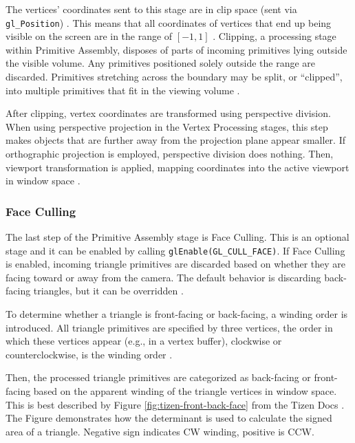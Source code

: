 \documentclass[
  digital,     %
  oneside,     %
  nosansbold,  %
  nocolorbold, %
  lof,         %
  lot,         %
]{fithesis4}
\begin{document}
The vertices' coordinates sent to this stage are in clip space (sent via \verb|gl_Position|) \cite{openglwiki-vertex-post-processing}.
This means that all coordinates of vertices that end up being visible on the screen are in the range of $[-1,1]$
\cite{learnopengl-coord-systems}. Clipping, a processing stage within Primitive Assembly, disposes of
parts of incoming primitives lying outside the visible volume. Any primitives positioned solely outside the range
are discarded. Primitives stretching across the boundary may be split, or \enquote{clipped}, into multiple primitives
that fit in the viewing volume \cite[p.12]{opengl-book}.

After clipping, vertex coordinates are transformed using perspective division.
When using perspective projection in the Vertex Processing stages, this step makes objects that are
further away from the projection plane appear smaller. If orthographic projection is employed,
perspective division does nothing.
Then, viewport transformation is applied, mapping coordinates
into the active viewport in window space \cite[p.12]{opengl-book}.

\subsubsection{Face Culling}
The last step of the Primitive Assembly stage is Face Culling. This is an optional stage and
it can be enabled by calling \verb|glEnable(GL_CULL_FACE)|.
If Face Culling is enabled, incoming triangle primitives are discarded based on whether they are facing toward or away from the camera.
The default behavior is discarding back-facing triangles, but it can be overridden \cite{openglwiki-face-culling}.

To determine whether a triangle is front-facing or back-facing, a winding order is introduced. All triangle primitives
are specified by three vertices, the order in which these vertices appear (e.g., in a vertex buffer),
clockwise or counterclockwise, is the winding order \cite{openglwiki-face-culling}\cite{tizen-face-culling}.

Then, the processed triangle primitives are categorized as back-facing or front-facing based on the apparent
winding of the triangle vertices in window space. This is best described by Figure \ref{fig:tizen-front-back-face}
from the Tizen Docs \cite{tizen-face-culling}. The Figure demonstrates how the determinant
is used to calculate the signed area of a triangle. Negative sign indicates CW winding,
positive is CCW.
\end{document}
